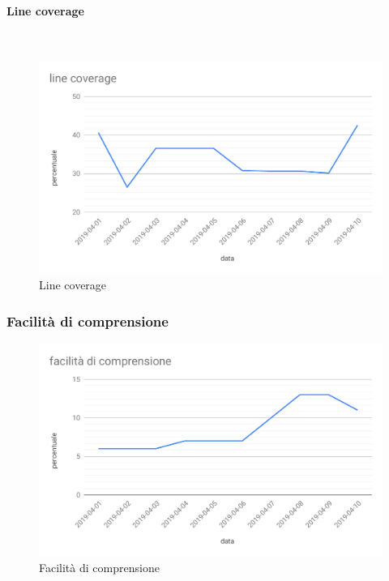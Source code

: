 \paragraph{Line coverage}\mbox{}\\
\begin{figure}[H]
	\centering
	\includegraphics[scale=0.6]{res/images/RQ/line-coverage-RQ.pdf}
	\caption{Line coverage}
\end{figure}


\subsubsection{Facilità di comprensione} %
\begin{figure}[H]
	\centering
	\includegraphics[scale=0.6]{res/images/RQ/facilita-di-comprensione.pdf}
	\caption{Facilità di comprensione}
\end{figure}

